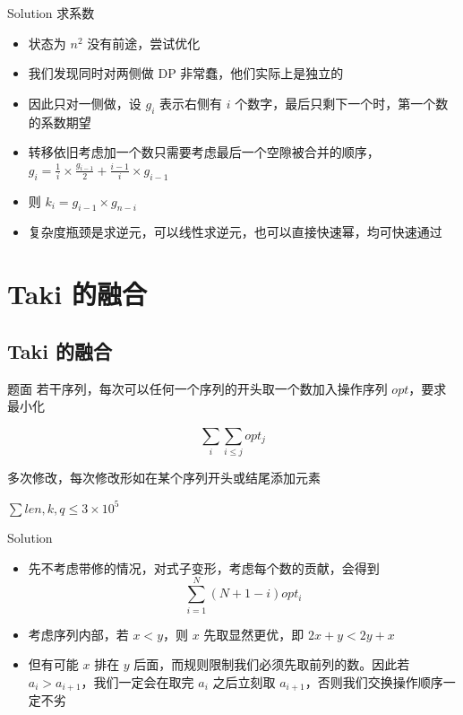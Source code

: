 ﻿\documentclass[aspectratio=169]{ctexbeamer}
\begin{document}
\begin{frame}{Solution}
    求系数
    \begin{itemize}
        \item 状态为 $n^2$ 没有前途，尝试优化
        \item 我们发现同时对两侧做 DP 非常蠢，他们实际上是独立的
        \item 因此只对一侧做，设 $g_i$ 表示右侧有 $i$ 个数字，最后只剩下一个时，第一个数的系数期望
        \item 转移依旧考虑加一个数只需要考虑最后一个空隙被合并的顺序，$g_i=\frac{1}{i}\times\frac{g_{i-1}}{2}+\frac{i-1}{i}\times g_{i-1}$
        \item 则 $k_i=g_{i-1}\times g_{n-i}$
        \item 复杂度瓶颈是求逆元，可以线性求逆元，也可以直接快速幂，均可快速通过
    \end{itemize}
\end{frame}

\section{Taki 的融合}
\subsection{Taki 的融合}
\begin{frame}{题面}
    若干序列，每次可以任何一个序列的开头取一个数加入操作序列 $opt$，要求最小化

    $$
        \sum_i \sum_{i\le j} opt_j
    $$

    多次修改，每次修改形如在某个序列开头或结尾添加元素

    $\sum len,k,q\le 3\times 10^5$
\end{frame}

\begin{frame}{Solution}
    \begin{itemize}
        \item 先不考虑带修的情况，对式子变形，考虑每个数的贡献，会得到
        $$
            \sum_{i=1}^{N}(N+1-i)opt_i
        $$
        \item 考虑序列内部，若 $x<y$，则 $x$ 先取显然更优，即 $2x+y<2y+x$
        \item 但有可能 $x$ 排在 $y$ 后面，而规则限制我们必须先取前列的数。因此若 $a_{i}>a_{i+1}$，我们一定会在取完 $a_i$ 之后立刻取 $a_{i+1}$，否则我们交换操作顺序一定不劣
    \end{itemize}
\end{frame}
\end{document}
